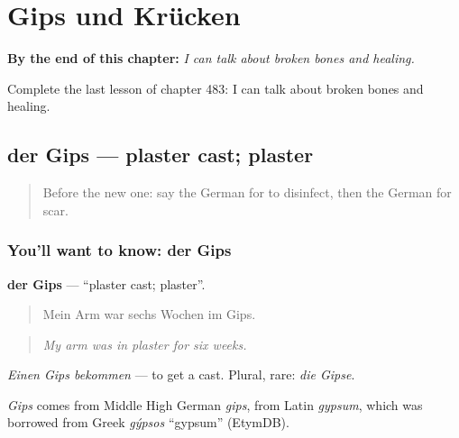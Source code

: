 
\chapter{Gips und Krücken}
\label{ch:ge-gips-und-krucken}

\begin{chapteropening}
\textbf{By the end of this chapter:} \emph{I can talk about broken bones and healing.}

Complete the last lesson of chapter 483: I can talk about broken bones and healing.
\end{chapteropening}

\section[der Gips]{der Gips — plaster cast; plaster}

\label{lesson:GE-C483-gips}



\begin{quote}
Before the new one: say the German for to disinfect, then the German for scar.
\end{quote}

\subsection*{You'll want to know: der Gips}
\textbf{der Gips} — \textquotedblleft{}plaster cast; plaster\textquotedblright{}.

\begin{quote}
Mein Arm war sechs Wochen im Gips.
\end{quote}

\begin{quote}
\emph{My arm was in plaster for six weeks.}
\end{quote}

\emph{Einen Gips bekommen} — to get a cast. Plural, rare: \emph{die Gipse}.

\begin{cousinweb}
\emph{Gips} comes from Middle High German \emph{gips}, from Latin \emph{gypsum}, which was borrowed from Greek \emph{gýpsos} \textquotedblleft{}gypsum\textquotedblright{} (EtymDB).
\end{cousinweb}

